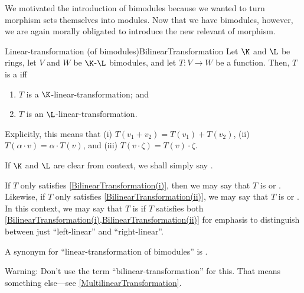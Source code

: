 We motivated the introduction of bimodules because we wanted to turn morphism sets themselves into modules.  Now that we have bimodules, however, we are again morally obligated to introduce the new relevant of morphism.
\begin{dfn}{Linear-transformation (of bimodules)}{BilinearTransformation}
	Let $\K$ and $\L$ be rings, let $V$ and $W$ be $\K$-$\L$ bimodules, and let $T\colon V\rightarrow W$ be a function.  Then, $T$ is a  iff
	\begin{enumerate}
		\item \label{BilinearTransformation(i)}$T$ is a $\K$-linear-transformation; and
		\item \label{BilinearTransformation(ii)}$T$ is an $\L$-linear-transformation.
	\end{enumerate}
	\begin{rmk}
		Explicitly, this means that (i) $T(v_1+v_2)=T(v_1)+T(v_2)$, (ii) $T(\alpha \cdot v)=\alpha \cdot T(v)$, and (iii) $T(v\cdot \zeta )=T(v)\cdot \zeta$.
	\end{rmk}
	\begin{rmk}
		If $\K$ and $\L$ are clear from context, we shall simply say .
	\end{rmk}
	\begin{rmk}
		If $T$ only satisfies \cref{BilinearTransformation(i)}, then we may say that $T$ is  or .  Likewise, if $T$ only satisfies \cref{BilinearTransformation(ii)}, we may say that $T$ is  or .  In this context, we may say that $T$ is  if $T$ satisfies both \cref{BilinearTransformation(i),BilinearTransformation(ii)} for emphasis to distinguish between just ``left-linear'' and ``right-linear''.
	\end{rmk}
	\begin{rmk}
		A synonym for ``linear-transformation of bimodules'' is \index{Bimodule-homomorphism}.
	\end{rmk}
	\begin{rmk}
		Warning:  Don't use the term ``bilinear-transformation'' for this.  That means something else---see \cref{MultilinearTransformation}.
	\end{rmk}
\end{dfn}
